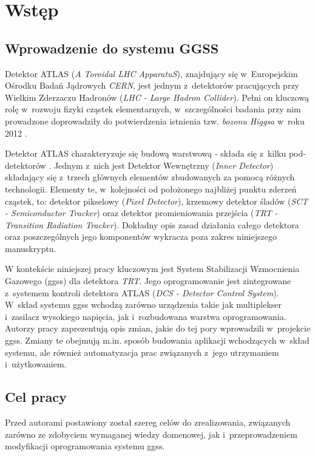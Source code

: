 \chapter{Wstęp}
\label{cha:wstep}

\section{Wprowadzenie do systemu GGSS}
Detektor ATLAS (\textit{A Toroidal LHC ApparatuS}), znajdujący się w~Europejskim Ośrodku Badań Jądrowych \textit{CERN}, jest jednym z~detektorów pracujących przy Wielkim Zderzaczu Hadronów (\textit{LHC - Large Hadron Collider}). Pełni on kluczową rolę w~rozwoju fizyki cząstek elementarnych, w~szczególności badania przy nim prowadzone doprowadziły do potwierdzenia istnienia tzw. \textit{bozonu Higgsa} w~roku 2012 \cite{AtlasWikipedia}. \par

Detektor ATLAS charakteryzuje się budową warstwową - składa się z~kilku pod-detektorów \cite{AtlasAGH}. Jednym z~nich jest Detektor Wewnętrzny (\textit{Inner Detector}) składający się z~trzech głównych elementów zbudowanych za pomocą różnych technologii. Elementy te, w~kolejności od położonego najbliżej punktu zderzeń cząstek, to: detektor pikselowy (\textit{Pixel Detector}), krzemowy detektor śladów (\textit{SCT - Semiconductor Tracker}) oraz detektor promieniowania przejścia (\textit{TRT - Transition Radiation Tracker}). Dokładny opis zasad działania całego detektora oraz poszczególnych jego komponentów wykracza poza zakres niniejszego manuskryptu.\par

W kontekście niniejszej pracy kluczowym jest System Stabilizacji Wzmocnienia Gazowego (\gls*{ggss}) dla detektora \textit{TRT}. Jego oprogramowanie jest zintegrowane \cite{AtlasAGH} z~systemem kontroli detektora ATLAS (\textit{DCS - Detector Control System}). W~skład systemu \gls*{ggss} wchodzą zarówno urządzenia takie jak multiplekser i~zasilacz wysokiego napięcia, jak i~rozbudowana warstwa oprogramowania. Autorzy pracy zaprezentują opis zmian, jakie do tej pory wprowadzili w~projekcie \gls*{ggss}. Zmiany te obejmują m.in. sposób budowania aplikacji wchodzących w~skład systemu, ale również automatyzacja prac związanych z~jego utrzymaniem i~użytkowaniem.



\section{Cel pracy}
Przed autorami postawiony został szereg celów do zrealizowania, związanych zarówno ze zdobyciem wymaganej wiedzy domenowej, jak i~przeprowadzeniem modyfikacji oprogramowania systemu \gls*{ggss}. \par

